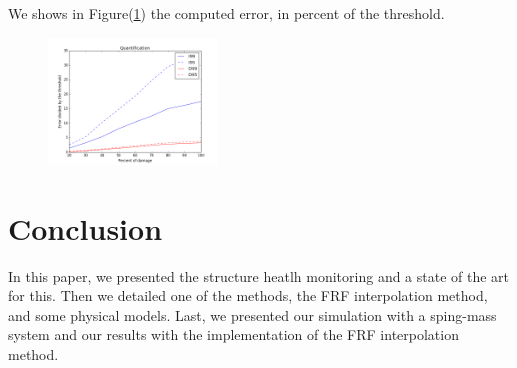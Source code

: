 \documentclass[journal]{IEEEtran}
\begin{document}
We shows in Figure(\ref{quant}) the computed error, in percent of the threshold.

\begin{figure}[h!]
  \centering
  \includegraphics[width=0.4\textwidth]{images/quantification.png}
  \caption{}
  \label{quant}
\end{figure}


\section{Conclusion}

In this paper, we presented the structure heatlh monitoring and a state of the art for this. Then we detailed one of the methods, the FRF interpolation method, and some physical models. Last, we presented our simulation with a sping-mass system and our results with the implementation of the FRF interpolation method.





%
%

\nocite{*}
\printbibliography
\end{document}
